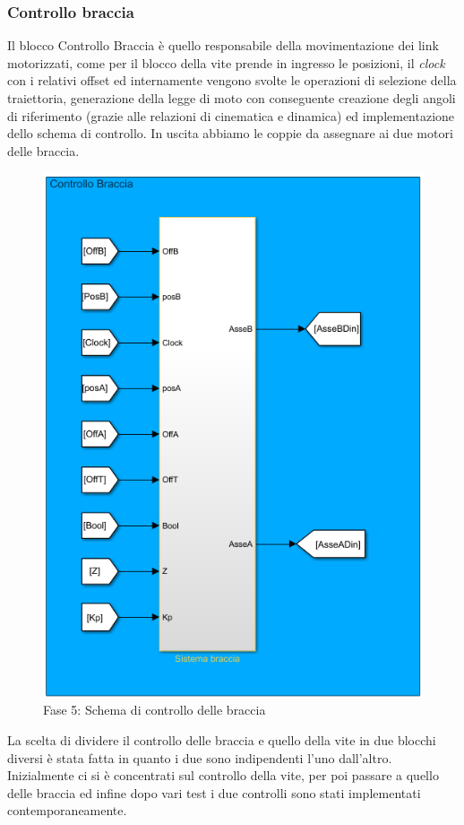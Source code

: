 \subsubsection*{Controllo braccia}
Il blocco Controllo Braccia è quello responsabile della movimentazione dei link motorizzati, come per il blocco della vite prende in ingresso le posizioni, il \textit{clock} con i relativi offset ed internamente vengono svolte le operazioni di selezione della traiettoria, generazione della legge di moto con conseguente creazione degli angoli di riferimento (grazie alle relazioni di cinematica e dinamica) ed implementazione dello schema di controllo. In uscita abbiamo le coppie da assegnare ai due motori delle braccia.
\begin{figure}[ht]
	\begin{center}
		\includegraphics[scale=0.75]{Immagini/Sperimentale/ControlloBraccia}
		\caption{Fase 5: Schema di controllo delle braccia}
		\label{fig:controlloBraccia}
	\end{center}
\end{figure}
La scelta di dividere il controllo delle braccia e quello della vite in due blocchi diversi è stata fatta in quanto i due sono indipendenti l'uno dall'altro. Inizialmente ci si è concentrati sul controllo della vite, per poi passare a quello delle braccia ed infine dopo vari test i due controlli sono stati implementati contemporaneamente.
